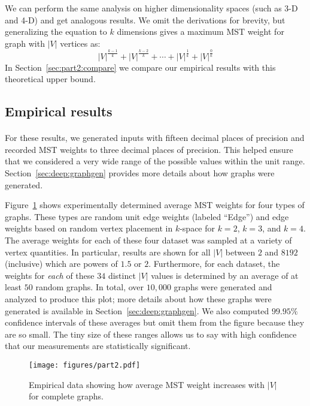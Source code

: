 We can perform the same analysis on higher dimensionality spaces (such as 3-D
and 4-D) and get analogous results. We omit the derivations for brevity, but
generalizing the equation to $k$ dimensions gives a maximum MST weight for graph
with $|V|$ vertices as:
\[ |V|^{\frac{k-1}{k}} + |V|^{\frac{k-2}{k}} + \cdots + |V|^{\frac{1}{k}} +
|V|^{\frac{0}{k}} \]
In Section~\ref{sec:part2:compare} we compare our empirical results with this
theoretical upper bound.

\subsection{Empirical results}
\paragraph{}
For these results, we generated inputs with fifteen decimal places of precision
and recorded MST weights to three decimal places of precision.  This helped
ensure that we considered a very wide range of the possible values within the
unit range.  Section~\ref{sec:deep:graphgen} provides more details about how
graphs were generated.

Figure~\ref{fig:part2} shows experimentally determined average MST weights for
four types of graphs.  These types are random unit edge weights (labeled
``Edge'') and edge weights based on random vertex placement in $k$-space for
$k=2$, $k=3$, and $k=4$.  The average weights for each of these four dataset was
sampled at a variety of vertex quantities.  In particular, results are shown for
all $|V|$ between $2$ and $8192$ (inclusive) which are powers of $1.5$ or $2$.
Furthermore, for each dataset, the weights for \textit{each} of these $34$
distinct $|V|$ values is determined by an average of at least $50$ random
graphs.  In total, over $10,000$ graphs were generated and analyzed to produce
this plot; more details about how these graphs were generated is available in
Section~\ref{sec:deep:graphgen}. We also computed $99.95\%$ confidence intervals
of these averages but omit them from the figure because they are so small.  The
tiny size of these ranges allows us to say with high confidence that our
measurements are statistically significant.

\begin{figure}[t!]
\centering
\texttt{[image: figures/part2.pdf]}
\caption{Empirical data showing how average MST weight increases with $|V|$
  for complete graphs.}
\label{fig:part2}
\end{figure}

